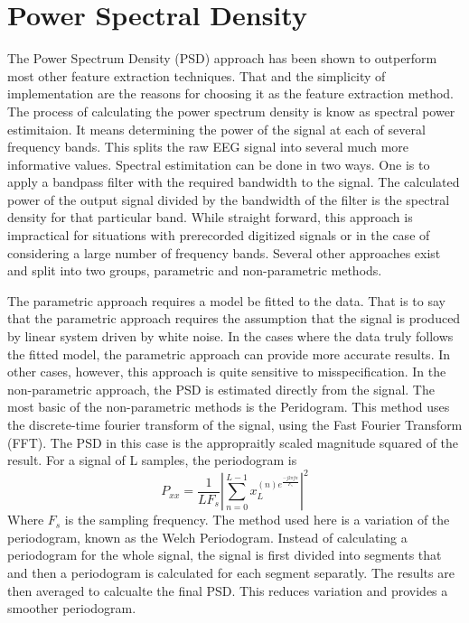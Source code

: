\documentclass[12pt, a4paper, fleqn]{memoir}%
\begin{document}
\section{Power Spectral Density}
\label{sec:psd}
The Power Spectrum Density (PSD) approach has been shown to outperform most other feature extraction techniques\cite{du2004temporal}. That and the simplicity of implementation are the reasons for choosing it as the feature extraction method. The process of calculating the power spectrum density is know as spectral power estimitaion. It means determining the power of the signal at each of several frequency bands. This splits the raw EEG signal into several much more informative values. Spectral estimitation can be done in two ways. One is to apply a bandpass filter with the required bandwidth to the signal. The calculated power of the output signal divided by the bandwidth of the filter is the spectral density for that particular band. While straight forward, this approach is impractical for situations with prerecorded digitized signals or in the case of considering a large number of frequency bands. Several other approaches exist and split into two groups, parametric and non-parametric methods\cite{stoica2005spectra}.

The parametric approach requires a model be fitted to the data. That is to say that the parametric approach requires the assumption that the signal is produced by linear system driven by white noise. In the cases where the data truly follows the fitted model, the parametric approach can provide more accurate results. In other cases, however, this approach is quite sensitive to misspecification. In the non-parametric approach, the PSD is estimated directly from the signal. The most basic of the non-parametric methods is the Peridogram. This method uses the discrete-time fourier transform of the signal, using the Fast Fourier Transform (FFT). The PSD in this case is the appropraitly scaled magnitude squared of the result.
For a signal of L samples, the periodogram is
$$P_{xx}=\frac{1}{LF_s}|\sum_{n=0}^{L-1}x_L^{(n)e^{\frac{-j2\pi fn}{F_s}}}|^{2}$$
Where $F_s$ is the sampling frequency.
The method used here is a variation of the periodogram, known as the Welch Periodogram. Instead of calculating a periodogram for the whole signal, the signal is first divided into segments that and then a periodogram is calculated for each segment separatly. The results are then averaged to calcualte the final PSD. This reduces variation and provides a smoother periodogram\cite{john1996digital}.
\end{document}
